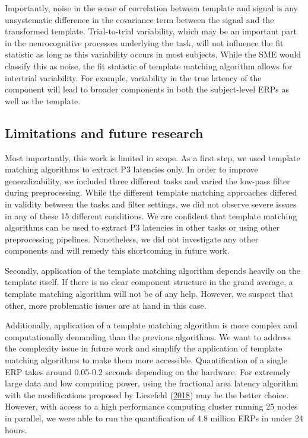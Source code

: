\documentclass[
  man]{apa7}
\begin{document}
Importantly, noise in the sense of correlation between template and signal is any unsystematic difference in the covariance term between the signal and the transformed template. Trial-to-trial variability, which may be an important part in the neurocognitive processes underlying the task, will not influence the fit statistic as long as this variability occurs in most subjects. While the SME would classify this as noise, the fit statistic of template matching algorithm allows for intertrial variability. For example, variability in the true latency of the component will lead to broader components in both the subject-level ERPs as well as the template.

\hypertarget{limitations-and-future-research}{%
\subsection{Limitations and future research}\label{limitations-and-future-research}}

Most importantly, this work is limited in scope. As a first step, we used template matching algorithms to extract P3 latencies only. In order to improve generalizability, we included three different tasks and varied the low-pass filter during preprocessing. While the different template matching approaches differed in validity between the tasks and filter settings, we did not observe severe issues in any of these 15 different conditions. We are confident that template matching algorithms can be used to extract P3 latencies in other tasks or using other preprocessing pipelines. Nonetheless, we did not investigate any other components and will remedy this shortcoming in future work.

Secondly, application of the template matching algorithm depends heavily on the template itself. If there is no clear component structure in the grand average, a template matching algorithm will not be of any help. However, we suspect that other, more problematic issues are at hand in this case.

Additionally, application of a template matching algorithm is more complex and computationally demanding than the previous algorithms. We want to address the complexity issue in future work and simplify the application of template matching algorithms to make them more accessible. Quantification of a single ERP takes around 0.05-0.2 seconds depending on the hardware. For extremely large data and low computing power, using the fractional area latency algorithm with the modifications proposed by Liesefeld (\protect\hyperlink{ref-liesefeld2018estimating}{2018}) may be the better choice. However, with access to a high performance computing cluster running 25 nodes in parallel, we were able to run the quantification of 4.8 million ERPs in under 24 hours.
\end{document}
